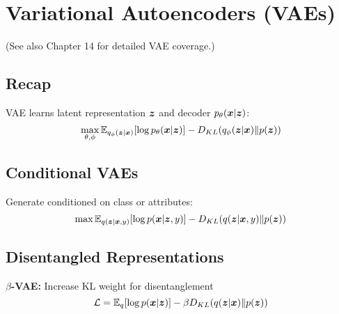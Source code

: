 
\section{Variational Autoencoders (VAEs)}
\label{sec:vaes}

(See also Chapter 14 for detailed VAE coverage.)

\subsection{Recap}

VAE learns latent representation $\boldsymbol{z}$ and decoder $p_{\theta}(\boldsymbol{x}|\boldsymbol{z})$:
\begin{equation}
\max_{\theta, \phi} \mathbb{E}_{q_{\phi}(\boldsymbol{z}|\boldsymbol{x})}[\log p_{\theta}(\boldsymbol{x}|\boldsymbol{z})] - D_{KL}(q_{\phi}(\boldsymbol{z}|\boldsymbol{x}) \| p(\boldsymbol{z}))
\end{equation}

\subsection{Conditional VAEs}

Generate conditioned on class or attributes:
\begin{equation}
\max \mathbb{E}_{q(\boldsymbol{z}|\boldsymbol{x}, y)}[\log p(\boldsymbol{x}|\boldsymbol{z}, y)] - D_{KL}(q(\boldsymbol{z}|\boldsymbol{x}, y) \| p(\boldsymbol{z}))
\end{equation}

\subsection{Disentangled Representations}

\textbf{$\beta$-VAE:} Increase KL weight for disentanglement
\begin{equation}
\mathcal{L} = \mathbb{E}_{q}[\log p(\boldsymbol{x}|\boldsymbol{z})] - \beta D_{KL}(q(\boldsymbol{z}|\boldsymbol{x}) \| p(\boldsymbol{z}))
\end{equation}

